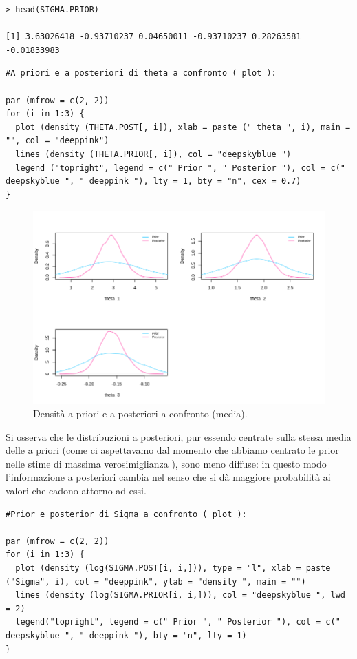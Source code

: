 {
\color{red}
\begin{Verbatim}
> head(SIGMA.PRIOR)

[1] 3.63026418 -0.93710237 0.04650011 -0.93710237 0.28263581 -0.01833983
\end{Verbatim}
}

\begin{lstlisting}[style=R]
#A priori e a posteriori di theta a confronto ( plot ):

par (mfrow = c(2, 2))
for (i in 1:3) {
  plot (density (THETA.POST[, i]), xlab = paste (" theta ", i), main = "", col = "deeppink")
  lines (density (THETA.PRIOR[, i]), col = "deepskyblue ")
  legend ("topright", legend = c(" Prior ", " Posterior "), col = c(" deepskyblue ", " deeppink "), lty = 1, bty = "n", cex = 0.7)
}
\end{lstlisting}

\begin{figure}
    \centering
    \includegraphics[totalheight=8.5cm]{img/esercizio11-2-3.png}
    \caption{  Densità a priori e a posteriori a confronto (media).}
\end{figure}

Si osserva che le distribuzioni a posteriori, pur essendo centrate sulla stessa 
media delle a priori (come ci aspettavamo dal momento che abbiamo centrato le 
prior nelle stime di massima verosimiglianza ), sono meno diffuse: 
in questo modo l'informazione a posteriori cambia nel senso che si dà maggiore 
probabilità ai valori che cadono attorno ad essi.

\begin{lstlisting}[style=R]
#Prior e posterior di Sigma a confronto ( plot ):

par (mfrow = c(2, 2))
for (i in 1:3) {
  plot (density (log(SIGMA.POST[i, i,])), type = "l", xlab = paste ("Sigma", i), col = "deeppink", ylab = "density ", main = "")
  lines (density (log(SIGMA.PRIOR[i, i,])), col = "deepskyblue ", lwd = 2)
  legend("topright", legend = c(" Prior ", " Posterior "), col = c(" deepskyblue ", " deeppink "), bty = "n", lty = 1)
}
\end{lstlisting}

